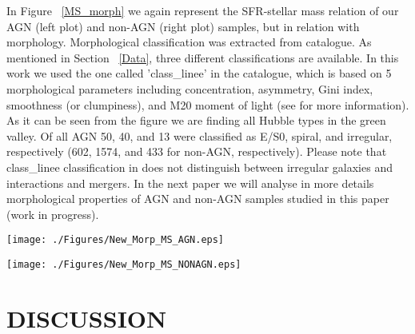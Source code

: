 \documentclass[fleqn,usenatbib]{mnras}
\begin{document}
In Figure ~\ref{MS_morph} we again represent the SFR-stellar mass relation of our AGN (left plot) and non-AGN (right plot) samples, but in relation with morphology. Morphological classification was extracted from \cite{Tasca2009} catalogue. As mentioned in Section ~\ref{Data}, three different classifications are available. In this work we used the one called 'class\_linee' in the catalogue, which is based on 5 morphological parameters including concentration, asymmetry, Gini index, smoothness (or clumpiness), and M20 moment of light (see \citet{Tasca2009} for more information). As it can be seen from the figure we are finding all Hubble types in the green valley. Of all AGN 50, 40, and 13 were classified as E/S0, spiral, and irregular, respectively (602, 1574, and 433 for non-AGN, respectively). Please note that class\_linee classification in \cite{Tasca2009} does not distinguish between irregular galaxies and interactions and mergers. In the next paper we will analyse in more details morphological properties of AGN and non-AGN samples studied in this paper (work in progress). 

\begin{figure*}
\centering
\begin{minipage}[c]{0.49\textwidth}
\texttt{[image: ./Figures/New\_Morp\_MS\_AGN.eps]}
\end{minipage}
\begin{minipage}[c]{0.49\textwidth}
\texttt{[image: ./Figures/New\_Morp\_MS\_NONAGN.eps]}
\end{minipage}
\caption[ ]{Same as Fig.~\ref{MS_both}, representing FIR green valley AGN (left) and non-AGN (right) samples, but in relation with morphology. Top and right histograms of each panel represent the stellar mass and SFR distributions, respectively, of three morphological types.   In all plots, elliptical and lenticular galaxies are represented with red triangles and red solid histograms, spirals with blue squares and blue dashed lines, and irregular and peculiar systems with green filled circles and green dash-dot-dash lines. Black solid and dashed lines show again the main sequence of SF (see Figure ~\ref{MS_both} for all information).
\label{MS_morph}}
\end{figure*} 


\section{DISCUSSION}
\end{document}
